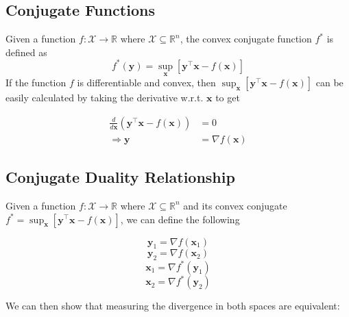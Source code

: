 \documentclass[10pt]{article}
\theoremstyle{definition}
\begin{document}
\subsection*{Conjugate Functions}

Given a function $f:\mathcal{X} \rightarrow \mathbb{R}$ where $\mathcal{X} \subseteq \mathbb{R}^n$, the convex conjugate function $f^*$ is defined as
\begin{equation}
f^*(\mathbf{y}) = \sup_{\mathbf{x}} \left[\mathbf{y}^\top \mathbf{x} - f(\mathbf{x})\right]
\end{equation}
\noindent
If the function $f$ is differentiable and convex, then $\sup_{\mathbf{x}}\left[\mathbf{y}^\top \mathbf{x} - f(\mathbf{x})\right]$ can be easily calculated by taking the derivative w.r.t. $\mathbf{x}$ to get

\begin{equation}
\begin{aligned}
\frac{d}{d\mathbf{x}} \left(\mathbf{y}^\top \mathbf{x} - f(\mathbf{x})\right) & = 0 \\
\Rightarrow \mathbf{y} & = \nabla f(\mathbf{x})
\end{aligned}
\end{equation}

\subsection*{Conjugate Duality Relationship}

Given a function $f:\mathcal{X} \rightarrow \mathbb{R}$ where $\mathcal{X} \subseteq \mathbb{R}^n$ and its convex conjugate $f^* = \sup_{\mathbf{x}} \left[\mathbf{y}^\top \mathbf{x} - f(\mathbf{x})\right]$, we can define the following

$$
\mathbf{y}_1 = \nabla f(\mathbf{x}_1)
$$
$$
\mathbf{y}_2 = \nabla f(\mathbf{x}_2)
$$
$$
\mathbf{x}_1 = \nabla f^*(\mathbf{y}_1)
$$
$$
\mathbf{x}_2 = \nabla f^*(\mathbf{y}_2)
$$

\noindent
We can then show that measuring the divergence in both spaces are equivalent:
\end{document}

